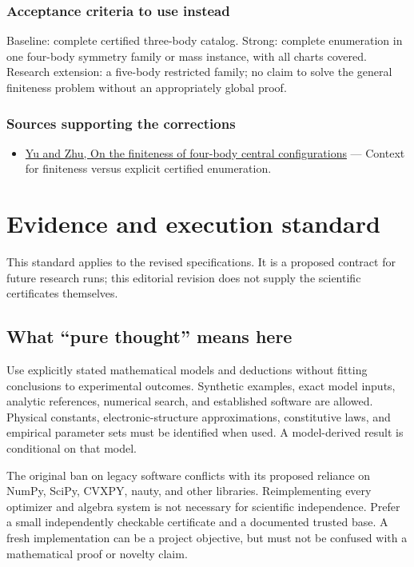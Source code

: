 \documentclass[
  11pt,
]{article}
\providecommand{\tightlist}{%
  \setlength{\itemsep}{0pt}\setlength{\parskip}{0pt}}
\begin{document}
\subsubsection{Acceptance criteria to use instead}

Baseline: complete certified three-body catalog. Strong: complete
enumeration in one four-body symmetry family or mass instance, with all
charts covered. Research extension: a five-body restricted family; no
claim to solve the general finiteness problem without an appropriately
global proof.

\subsubsection{Sources supporting the corrections}

\begin{itemize}
\tightlist
\item
  \href{https://arxiv.org/abs/2103.08906}{Yu and Zhu, On the finiteness
  of four-body central configurations} --- Context for finiteness versus
  explicit certified enumeration.
\end{itemize}

\section{Evidence and execution standard}

This standard applies to the revised specifications. It is a proposed
contract for future research runs; this editorial revision does not
supply the scientific certificates themselves.

\subsection{What ``pure thought'' means here}

Use explicitly stated mathematical models and deductions without fitting
conclusions to experimental outcomes. Synthetic examples, exact model
inputs, analytic references, numerical search, and established software
are allowed. Physical constants, electronic-structure approximations,
constitutive laws, and empirical parameter sets must be identified when
used. A model-derived result is conditional on that model.

The original ban on legacy software conflicts with its proposed reliance
on NumPy, SciPy, CVXPY, nauty, and other libraries. Reimplementing every
optimizer and algebra system is not necessary for scientific
independence. Prefer a small independently checkable certificate and a
documented trusted base. A fresh implementation can be a project
objective, but must not be confused with a mathematical proof or novelty
claim.
\end{document}

